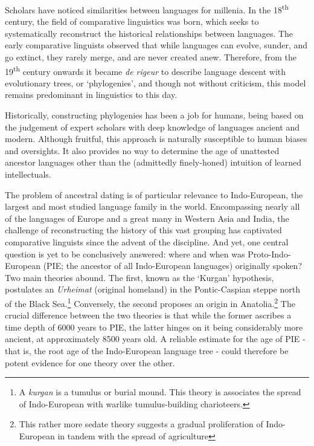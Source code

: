 \documentclass[10pt,journal,compsoc]{IEEEtran}
\newcommand{\ts}{\textsuperscript}
\begin{document}
Scholars have noticed similarities between languages for millenia. In the 18\ts{th} century, the field of comparative linguistics was born, which seeks to systematically reconstruct the historical relationships between languages. The early comparative linguists observed that while languages can evolve, sunder, and go extinct, they rarely merge, and are never created anew. Therefore, from the 19\ts{th} century onwards it became \textit{de rigeur} to describe language descent with evolutionary trees, or `phylogenies', and though not without criticism, this model remains predominant in linguistics to this day.

Historically, constructing phylogenies has been a job for humans, being based on the judgement of expert scholars with deep knowledge of languages ancient and modern. Although fruitful, this approach is naturally susceptible to human biases and oversights. It also provides no way to determine the age of unattested ancestor languages other than the (admittedly finely-honed) intuition of learned intellectuals.

The problem of ancestral dating is of particular relevance to Indo-European, the largest and most studied language family in the world. Encompassing nearly all of the languages of Europe and a great many in Western Asia and India, the challenge of reconstructing the history of this vast grouping has captivated comparative linguists since the advent of the discipline. And yet, one central question is yet to be conclusively answered: where and when was Proto-Indo-European (PIE; the ancestor of all Indo-European languages) originally spoken? Two main theories abound. The first, known as the `Kurgan' hypothesis, postulates an \textit{Urheimat} (original homeland) in the Pontic-Caspian steppe north of the Black Sea\cite{gimbutas1974gods}.\footnote{A \textit{kurgan} is a tumulus or burial mound. This theory is associates the spread of Indo-European with warlike tumulus-building charioteers.} Conversely, the second proposes an origin in Anatolia\cite{renfrew2001anatolian}.\footnote{This rather more sedate theory suggests a gradual proliferation of Indo-European in tandem with the spread of agriculture} The crucial difference between the two theories is that while the former ascribes a time depth of 6000 years to PIE, the latter hinges on it being considerably more ancient, at approximately 8500 years old. A reliable estimate for the age of PIE - that is, the root age of the Indo-European language tree - could therefore be potent evidence for one theory over the other.
\end{document}
